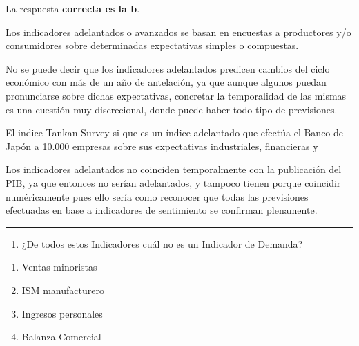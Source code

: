 \documentclass[
  letterpaper,
  DIV=11,
  numbers=noendperiod]{scrreprt}
\providecommand{\tightlist}{%
  \setlength{\itemsep}{0pt}\setlength{\parskip}{0pt}}\usepackage{longtable,booktabs,array}
\begin{document}
\begin{tcolorbox}[enhanced jigsaw, left=2mm, opacityback=0, colback=white, breakable, arc=.35mm, bottomrule=.15mm, rightrule=.15mm, toprule=.15mm, leftrule=.75mm, colframe=quarto-callout-tip-color-frame]
\begin{minipage}[t]{5.5mm}
\textcolor{quarto-callout-tip-color}{\faLightbulb}
\end{minipage}%
\begin{minipage}[t]{\textwidth - 5.5mm}

La respuesta \textbf{correcta es la b}.

Los indicadores adelantados o avanzados se basan en encuestas a
productores y/o consumidores sobre determinadas expectativas simples o
compuestas.

No se puede decir que los indicadores adelantados predicen cambios del
ciclo económico con más de un año de antelación, ya que aunque algunos
puedan pronunciarse sobre dichas expectativas, concretar la temporalidad
de las mismas es una cuestión muy discrecional, donde puede haber todo
tipo de previsiones.

El indice Tankan Survey si que es un índice adelantado que efectúa el
Banco de Japón a 10.000 empresas sobre sus expectativas industriales,
financieras y

Los indicadores adelantados no coinciden temporalmente con la
publicación del PIB, ya que entonces no serían adelantados, y tampoco
tienen porque coincidir numéricamente pues ello sería como reconocer que
todas las previsiones efectuadas en base a indicadores de sentimiento se
confirman plenamente.

\end{minipage}%
\end{tcolorbox}

\begin{center}\rule{0.5\linewidth}{0.5pt}\end{center}

\begin{enumerate}
\def\labelenumi{\arabic{enumi}.}
\setcounter{enumi}{24}
\tightlist
\item
  ¿De todos estos Indicadores cuál no es un Indicador de Demanda?
\end{enumerate}

\begin{enumerate}
\def\labelenumi{\alph{enumi})}
\item
  Ventas minoristas
\item
  ISM manufacturero
\item
  Ingresos personales
\item
  Balanza Comercial
\end{enumerate}
\end{document}

